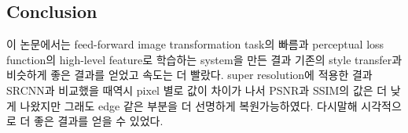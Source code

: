 \documentclass[extendedabs]{bmvc2k}
\begin{document}
  \subsection{Conclusion}
  \quad 이 논문에서는 feed-forward image transformation task의 빠름과 perceptual loss function의 high-level feature로 학습하는 system을 만든 결과 기존의 style transfer과 비슷하게 좋은 결과를 얻었고
  속도는 더 빨랐다. super resolution에 적용한 결과 SRCNN과 비교했을 때역시 pixel 별로 값이 차이가 나서 PSNR과 SSIM의 값은 더 낮게 나왔지만 그래도 edge 같은 부분을 더 선명하게 복원가능하였다. 다시말해 시각적으로 더 좋은 결과를 얻을 수 있었다.

\newpage

\end{document}
